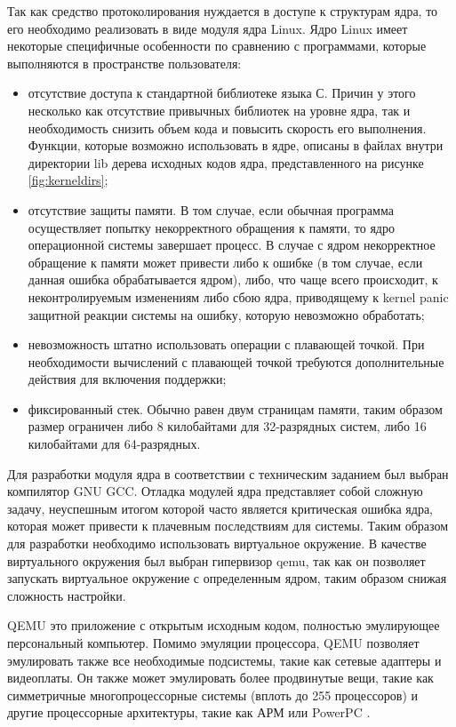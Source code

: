 \documentclass{gost7.32-2001}
\begin{document}
Так как средство протоколирования нуждается в доступе к структурам
ядра, то его необходимо реализовать в виде модуля ядра Linux. Ядро
Linux имеет некоторые специфичные особенности по сравнению с
программами, которые выполняются в пространстве пользователя:
\begin{itemize}
\item
  отсутствие доступа к стандартной библиотеке языка С. Причин у этого
  несколько \dash как отсутствие привычных библиотек на уровне ядра,
  так и необходимость снизить объем кода и повысить скорость его
  выполнения. Функции, которые возможно использовать в ядре, описаны в
  файлах внутри директории lib дерева исходных кодов ядра,
  представленного на рисунке \ref{fig:kerneldirs};
\item
  отсутствие защиты памяти. В том случае, если обычная программа
  осуществляет попытку некорректного обращения к памяти, то ядро
  операционной системы завершает процесс. В случае с ядром
  некорректное обращение к памяти может привести либо к ошибке (в том
  случае, если данная ошибка обрабатывается ядром), либо, что чаще
  всего происходит, к неконтролируемым изменениям либо сбою ядра,
  приводящему к kernel panic \dash защитной реакции системы на ошибку,
  которую невозможно обработать;
\item
  невозможность штатно использовать операции с плавающей точкой. При
  необходимости вычислений с плавающей точкой требуются дополнительные
  действия для включения поддержки;
\item
  фиксированный стек. Обычно равен двум страницам памяти, таким
  образом размер ограничен либо 8 килобайтами для 32-разрядных систем,
  либо 16 килобайтами для 64-разрядных.
\end{itemize}


Для разработки модуля ядра в соответствии с техническим заданием был
выбран компилятор GNU GCC. Отладка модулей ядра представляет собой
сложную задачу, неуспешным итогом которой часто является критическая
ошибка ядра, которая может привести к плачевным последствиям для
системы. Таким образом для разработки необходимо использовать
виртуальное окружение. В качестве виртуального окружения был выбран
гипервизор qemu, так как он позволяет запускать виртуальное окружение
с определенным ядром, таким образом снижая сложность настройки.

QEMU \dash это приложение с открытым исходным кодом, полностью эмулирующее
персональный компьютер. Помимо эмуляции процессора, QEMU позволяет
эмулировать также все необходимые подсистемы, такие как сетевые
адаптеры и видеоплаты. Он также может эмулировать более продвинутые
вещи, такие как симметричные многопроцессорные системы (вплоть до 255
процессоров) и другие процессорные архитектуры, такие как АРМ или
PowerPC .
\end{document}
